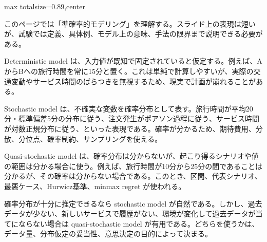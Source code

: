 \begin{minipage}[t]{0.58\textwidth}
\begin{adjustbox}{max totalsize={\textwidth}{0.89\textheight},center}
\begin{minipage}{\textwidth}\scriptsize
{}このページでは「準確率的モデリング」を理解する。スライド上の表現は短いが、試験では定義、具体例、モデル上の意味、手法の限界まで説明できる必要がある。\par
Deterministic model は、入力値が既知で固定されていると仮定する。例えば、AからBへの旅行時間を常に15分と置く。これは単純で計算しやすいが、実際の交通変動やサービス時間のばらつきを無視するため、現実で計画が崩れることがある。\par
Stochastic model は、不確実な変数を確率分布として表す。旅行時間が平均20分・標準偏差5分の分布に従う、注文発生がポアソン過程に従う、サービス時間が対数正規分布に従う、といった表現である。確率が分かるため、期待費用、分散、分位点、確率制約、サンプリングを使える。\par
Quasi-stochastic model は、確率分布は分からないが、起こり得るシナリオや値の範囲は分かる場合に使う。例えば、旅行時間が10分から25分の間であることは分かるが、その確率は分からない場合である。このとき、区間、代表シナリオ、最悪ケース、Hurwicz基準、minmax regret が使われる。\par
確率分布が十分に推定できるなら stochastic model が自然である。しかし、過去データが少ない、新しいサービスで履歴がない、環境が変化して過去データが当てにならない場合は quasi-stochastic model が有用である。どちらを使うかは、データ量、分布仮定の妥当性、意思決定の目的によって決まる。\par

\end{minipage}
\end{adjustbox}
\end{minipage}
